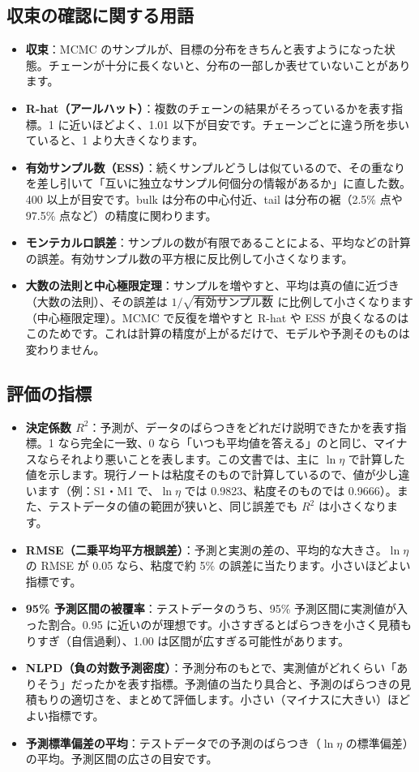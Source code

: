 \documentclass[paper=a4paper,fontsize=10.5pt,line_length=44zw,number_of_lines=38]{jlreq}
\newenvironment{termlist}{\begin{itemize}[label=・,leftmargin=1\zw,labelwidth=1\zw,labelsep=0pt,itemsep=0.4ex,topsep=0.6ex,parsep=0pt]}{\end{itemize}}
\newcommand{\term}[1]{\item \textbf{#1}：}
\begin{document}
\subsection{収束の確認に関する用語}
\begin{termlist}
\term{収束}MCMC のサンプルが、目標の分布をきちんと表すようになった状態。チェーンが十分に長くないと、分布の一部しか表せていないことがあります。
\term{R-hat（アールハット）}複数のチェーンの結果がそろっているかを表す指標。1 に近いほどよく、1.01 以下が目安です。チェーンごとに違う所を歩いていると、1 より大きくなります。
\term{有効サンプル数（ESS）}続くサンプルどうしは似ているので、その重なりを差し引いて「互いに独立なサンプル何個分の情報があるか」に直した数。400 以上が目安です。bulk は分布の中心付近、tail は分布の裾（2.5\% 点や 97.5\% 点など）の精度に関わります。
\term{モンテカルロ誤差}サンプルの数が有限であることによる、平均などの計算の誤差。有効サンプル数の平方根に反比例して小さくなります。
\term{大数の法則と中心極限定理}サンプルを増やすと、平均は真の値に近づき（大数の法則）、その誤差は $1/\sqrt{\text{有効サンプル数}}$ に比例して小さくなります（中心極限定理）。MCMC で反復を増やすと R-hat や ESS が良くなるのはこのためです。これは計算の精度が上がるだけで、モデルや予測そのものは変わりません。
\end{termlist}

\subsection{評価の指標}
\begin{termlist}
\term{決定係数 $R^2$}予測が、データのばらつきをどれだけ説明できたかを表す指標。1 なら完全に一致、0 なら「いつも平均値を答える」のと同じ、マイナスならそれより悪いことを表します。この文書では、主に $\ln\eta$ で計算した値を示します。現行ノートは粘度そのもので計算しているので、値が少し違います（例：S1・M1 で、$\ln\eta$ では 0.9823、粘度そのものでは 0.9666）。また、テストデータの値の範囲が狭いと、同じ誤差でも $R^2$ は小さくなります。
\term{RMSE（二乗平均平方根誤差）}予測と実測の差の、平均的な大きさ。$\ln\eta$ の RMSE が 0.05 なら、粘度で約 5\% の誤差に当たります。小さいほどよい指標です。
\term{95\% 予測区間の被覆率}テストデータのうち、95\% 予測区間に実測値が入った割合。0.95 に近いのが理想です。小さすぎるとばらつきを小さく見積もりすぎ（自信過剰）、1.00 は区間が広すぎる可能性があります。
\term{NLPD（負の対数予測密度）}予測分布のもとで、実測値がどれくらい「ありそう」だったかを表す指標。予測値の当たり具合と、予測のばらつきの見積もりの適切さを、まとめて評価します。小さい（マイナスに大きい）ほどよい指標です。
\term{予測標準偏差の平均}テストデータでの予測のばらつき（$\ln\eta$ の標準偏差）の平均。予測区間の広さの目安です。
\end{termlist}
\end{document}

